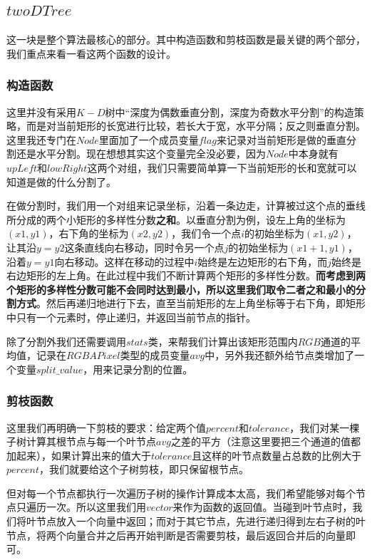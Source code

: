 \documentclass[UTF8]{ctexart}
\begin{document}
		\subsection{$twoDTree$}\label{twoDTree}
		
		\indent 这一块是整个算法最核心的部分。其中构造函数和剪枝函数是最关键的两个部分，我们重点来看一看这两个函数的设计。
		
		\subsubsection{构造函数}
		\indent 这里并没有采用$K-D$树中“深度为偶数垂直分割，深度为奇数水平分割”的构造策略，而是对当前矩形的长宽进行比较，若长大于宽，水平分隔；反之则垂直分割。这里我还专门在$Node$里面加了一个成员变量$flag$来记录对当前矩形是做的垂直分割还是水平分割。现在想想其实这个变量完全没必要，因为$Node$中本身就有$upLeft$和$lowRight$这两个对组，我们只需要简单算一下当前矩形的长和宽就可以知道是做的什么分割了。
		
		\indent 在做分割时，我们用一个对组来记录坐标，沿着一条边走，计算被过这个点的垂线所分成的两个小矩形的多样性分数\textbf{之和}。以垂直分割为例，设左上角的坐标为$(x1, y1)$，右下角的坐标为$(x2, y2)$，我们令一个点$i$的初始坐标为$(x1, y2)$，让其沿$y = y2$这条直线向右移动，同时令另一个点$j$的初始坐标为$(x1+1, y1)$，沿着$y = y1$向右移动。这样在移动的过程中$i$始终是左边矩形的右下角，而$j$始终是右边矩形的左上角。在此过程中我们不断计算两个矩形的多样性分数。\textbf{而考虑到两个矩形的多样性分数可能不会同时达到最小，所以这里我们取令二者之和最小的分割方式}。然后再递归地进行下去，直至当前矩形的左上角坐标等于右下角，即矩形中只有一个元素时，停止递归，并返回当前节点的指针。
		
		\indent 除了分割外我们还需要调用$stats$类，来帮我们计算出该矩形范围内$RGB$通道的平均值，记录在$RGBAPixel$类型的成员变量$avg$中，另外我还额外给节点类增加了一个变量$split\_value$，用来记录分割的位置。
		
		\subsubsection{剪枝函数}
		\indent 这里我们再明确一下剪枝的要求：\textcolor[rgb]{0.8,0.1,0.1}{给定两个值$percent$和$tolerance$，我们对某一棵子树计算其根节点与每一个叶节点$avg$之差的平方（注意这里要把三个通道的值都加起来），如果计算出来的值大于$tolerance$且这样的叶节点数量占总数的比例大于$percent$，我们就要给这个子树剪枝，即只保留根节点}。
		
		\indent 但对每一个节点都执行一次遍历子树的操作计算成本太高，我们希望能够对每个节点只遍历一次。所以这里我们用$vector$来作为函数的返回值。当碰到叶节点时，我们将叶节点放入一个向量中返回；而对于其它节点，先进行递归得到左右子树的叶节点，将两个向量合并之后再开始判断是否需要剪枝，最后返回合并后的向量即可。
		
\end{document}
